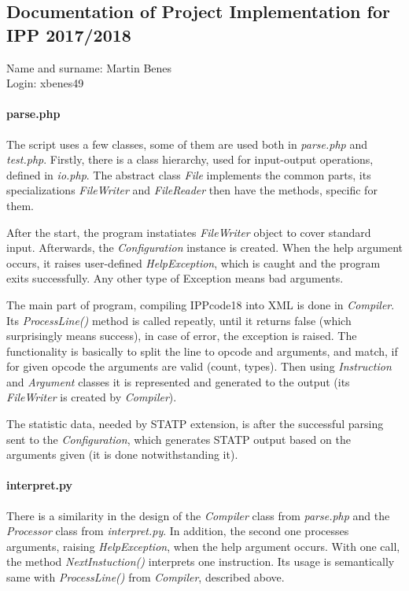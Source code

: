 \documentclass[10pt,a4paper,titlepage]{article}
\begin{document}

\setcounter{page}{1}

\begin{center}
\subsection*{Documentation of Project Implementation for IPP 2017/2018}
Name and surname: Martin Benes \\
Login: xbenes49
\end{center}

\paragraph{parse.php}
The script uses a few classes, some of them are used both in {\it parse.php}
and {\it test.php}. Firstly, there is a class hierarchy, used for input-output
operations, defined in {\it io.php}. The abstract class {\it File} implements
the common parts, its specializations {\it FileWriter} and {\it FileReader}
then have the methods, specific for them.

After the start, the program instatiates {\it FileWriter} object to cover
standard input. Afterwards, the {\it Configuration} instance is created.
When the help argument occurs, it raises user-defined {\it HelpException},
which is caught and the program exits successfully. Any other type of Exception
means bad arguments.

The main part of program, compiling IPPcode18 into XML is done in {\it Compiler}.
Its {\it ProcessLine()} method is called repeatly, until it returns false (which
surprisingly means success), in case of error, the exception is raised. The
functionality is basically to split the line to opcode and arguments, and
match, if for given opcode the arguments are valid (count, types). Then using
{\it Instruction} and {\it Argument} classes it is represented and generated
to the output (its {\it FileWriter} is created by {\it Compiler}).

The statistic data, needed by STATP extension, is after the
successful parsing sent to the {\it Configuration}, which generates STATP
output based on the arguments given (it is done notwithstanding it).



\paragraph{interpret.py}
There is a similarity in the design of the {\it Compiler} class from
{\it parse.php} and the {\it Processor} class from {\it interpret.py}.
In addition, the second one processes arguments, raising {\it HelpException},
when the help argument occurs. With one call, the method {\it NextInstuction()}
interprets one instruction. Its usage is semantically same with
{\it ProcessLine()} from {\it Compiler}, described above.
\end{document}
